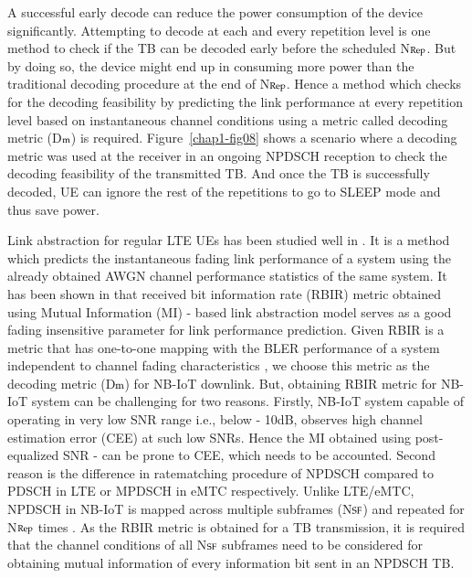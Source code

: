 \begin{multicols}{2}
A successful early decode can reduce the power consumption of the device significantly. Attempting to decode at each and every repetition level is one method to check if the TB can be decoded early before the scheduled N$\scriptsize{\text{Rep}}$. But by doing so, the device might end up in consuming more power than the traditional decoding procedure at the end of N$\scriptsize{\text{Rep}}$. Hence a method which checks for the decoding feasibility by predicting the link performance at every repetition level based on instantaneous channel conditions using a metric called decoding metric (D$\scriptsize{\text{m}}$) is required. Figure~\ref{chap1-fig08} shows a scenario where a decoding metric was used at the receiver in an ongoing NPDSCH reception to check the decoding feasibility of the transmitted TB. And once the TB is successfully decoded, UE can ignore the rest of the repetitions to go to SLEEP mode and thus save power.

Link abstraction for regular LTE UEs has been studied well in \cite{art1-key29}. It is a method which predicts the instantaneous fading link performance of a system using the already obtained AWGN channel performance statistics of the same system. It has been shown in \cite{art1-key29} that received bit information rate (RBIR) metric obtained using Mutual Information (MI) - based link abstraction model serves as a good fading insensitive parameter for link performance prediction. Given RBIR is a metric that has one-to-one mapping with the BLER performance of a system independent to channel fading characteristics \cite{art1-key07}, we choose this metric as the decoding metric (D$\scriptsize{\text{m}}$) for NB-IoT downlink. But, obtaining RBIR metric for NB-IoT system can be challenging for two reasons. Firstly, NB-IoT system capable of operating in very low SNR range i.e., below - 10dB, observes high channel estimation error (CEE) at such low SNRs. Hence the MI obtained using post-equalized SNR \cite{art1-key29}-\cite{art1-key30} can be prone to CEE, which needs to be accounted. Second reason is the difference in ratematching procedure of NPDSCH compared to PDSCH in LTE or MPDSCH in eMTC respectively. Unlike LTE/eMTC, NPDSCH in NB-IoT is mapped across multiple subframes (N$\scriptsize{\text{SF}}$) and repeated for N$\scriptsize{\text{Rep}}$ times \cite{art1-key27}. As the RBIR metric is obtained for a TB transmission, it is required that the channel conditions of all N$\scriptsize{\text{SF}}$ subframes need to be considered for obtaining mutual information of every information bit sent in an NPDSCH TB.


\end{multicols}
